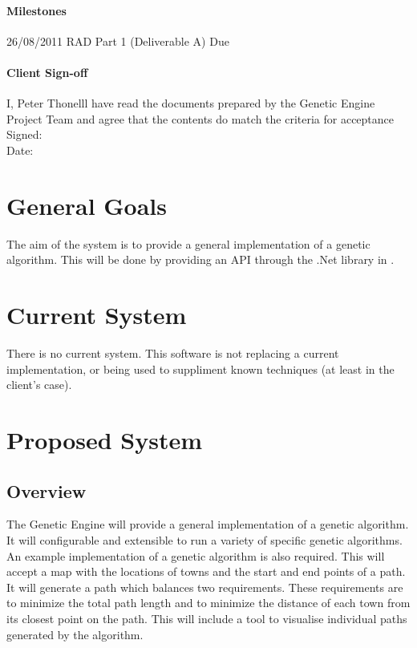 \paragraph*{Milestones}
26/08/2011 RAD Part 1 (Deliverable A) Due

\paragraph*{Client Sign-off}
I, Peter Thonelll have read the documents prepared by the Genetic Engine Project Team and agree that the contents do match the criteria for acceptance \\
Signed: \hfill \\
Date: \hfill \\

\clearpage


%
%
\section{General Goals}
The aim of the system is to provide a general implementation of a genetic algorithm. 
This will be done by providing an API through the .Net library in \csharp. 


%
%
\section{Current System}
There is no current system. %
This software is not replacing a current implementation, or being used to suppliment known techniques (at least in the client's case).


%
%

\section{Proposed System}
\subsection{Overview}
The Genetic Engine will provide a general implementation of a genetic algorithm. It will configurable and extensible to run a variety of specific genetic algorithms.
An example implementation of a genetic algorithm is also required. This will accept a map with the locations of towns and the start and end points of a path. It will generate a path which balances two requirements. These requirements are to minimize the total path length and to minimize the distance of each town from its closest point on the path. This will include a tool to visualise individual paths generated by the algorithm.

